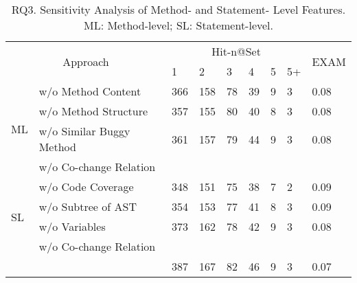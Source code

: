 \begin{table}[t]
	\caption{RQ3. Sensitivity Analysis of Method- and Statement- Level Features. ML: Method-level; SL: Statement-level.}
	{\small
		\begin{center}
			\renewcommand{\arraystretch}{1}
			\begin{tabular}{p{0.3cm}<{\centering}|p{3cm}|p{0.3cm}<{\centering}|p{0.3cm}<{\centering}|p{0.2cm}<{\centering}|p{0.2cm}<{\centering}|p{0.15cm}<{\centering}|p{0.15cm}<{\centering}|p{0.7cm}<{\centering}}
				\hline
				\multicolumn{2}{c|}{\multirow{2}{*}{Approach}}    & \multicolumn{6}{c|}{Hit-n@Set}& \multirow{2}{*}{EXAM}\\
				\cline{3-8}
				                 \multicolumn{2}{c|}{}   &1&2&3&4&5&5+&\\
				
				\hline 
				\multirow{4}{*}{ML}&w/o Method Content              & 366 & 158 & 78  & 39 & 9 & 3   & 0.08\\\cline{2-9}
				&w/o	Method Structure	                        & 357 & 155 & 80  & 40 & 8 & 3   & 0.08\\ \cline{2-9}
				&w/o Similar Buggy Method    	& 361 & 157 & 79  & 44 & 9 & 3   & 0.08\\ \cline{2-9}
				&w/o Co-change Relation          &  &  &   &  &  &    & \\ \cline{2-9}
				\hline
				\multirow{4}{*}{SL}&w/o Code Coverage               & 348 & 151 & 75  & 38 & 7 & 2   & 0.09\\
				&w/o	Subtree of AST  	        & 354 & 153 & 77  & 41 & 8 & 3   & 0.09\\ \cline{2-9}
				&w/o Variables               	& 373 & 162 & 78  & 42 & 9 & 3   & 0.08\\ \cline{2-9}
				&w/o Co-change Relation          &  &  &   &  &  &    & \\ \cline{2-9}
				\hline
			&	\tool                           & 387 & 167 & 82  & 46 & 9 & 3   & 0.07\\ \cline{2-9}
				\hline
			\end{tabular}
			
			\label{fig:rq3-1}
		\end{center}
	}
\end{table}

